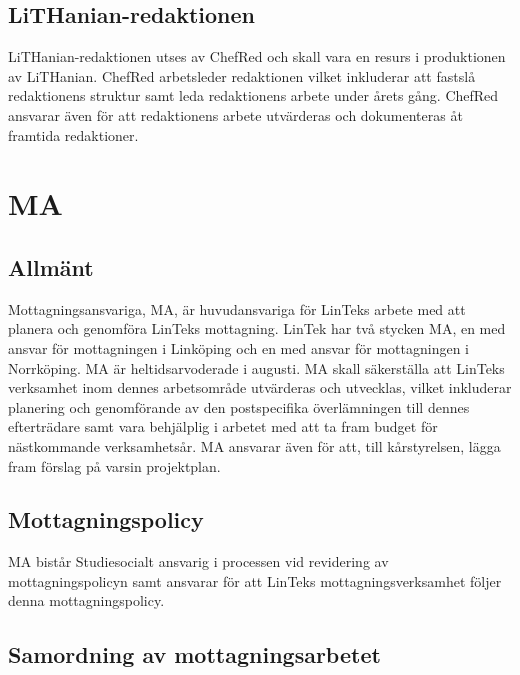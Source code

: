 \hypertarget{lithanian-redaktionen}{%
\subsection{LiTHanian-redaktionen}\label{lithanian-redaktionen}}

LiTHanian-redaktionen utses av ChefRed och skall vara en resurs i
produktionen av LiTHanian. ChefRed arbetsleder redaktionen vilket
inkluderar att fastslå redaktionens struktur samt leda redaktionens
arbete under årets gång. ChefRed ansvarar även för att redaktionens
arbete utvärderas och dokumenteras åt framtida redaktioner.

\hypertarget{ma}{%
\section{MA}\label{ma}}

\hypertarget{allmuxe4nt-9}{%
\subsection{Allmänt}\label{allmuxe4nt-9}}

Mottagningsansvariga, MA, är huvudansvariga för LinTeks arbete med att
planera och genomföra LinTeks mottagning. LinTek har två stycken MA, en
med ansvar för mottagningen i Linköping och en med ansvar för
mottagningen i Norrköping. MA är heltidsarvoderade i augusti. MA skall
säkerställa att LinTeks verksamhet inom dennes arbetsområde utvärderas
och utvecklas, vilket inkluderar planering och genomförande av den
postspecifika överlämningen till dennes efterträdare samt vara
behjälplig i arbetet med att ta fram budget för nästkommande
verksamhetsår. MA ansvarar även för att, till kårstyrelsen, lägga fram
förslag på varsin projektplan.

\hypertarget{mottagningspolicy}{%
\subsection{Mottagningspolicy}\label{mottagningspolicy}}

MA bistår Studiesocialt ansvarig i processen vid revidering av
mottagningspolicyn samt ansvarar för att LinTeks mottagningsverksamhet
följer denna mottagningspolicy.

\hypertarget{samordning-av-mottagningsarbetet}{%
\subsection{Samordning av
mottagningsarbetet}\label{samordning-av-mottagningsarbetet}}


